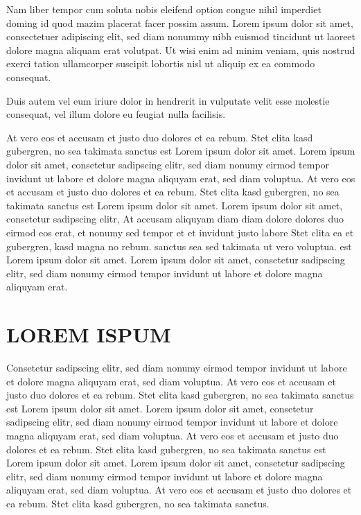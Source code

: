 \documentclass[]{../metanetpaper}
\begin{document}
Nam liber tempor cum soluta nobis eleifend option congue nihil imperdiet doming id quod mazim placerat facer possim assum. Lorem ipsum dolor sit amet, consectetuer adipiscing elit, sed diam nonummy nibh euismod tincidunt ut laoreet dolore magna aliquam erat volutpat. Ut wisi enim ad minim veniam, quis nostrud exerci tation ullamcorper suscipit lobortis nisl ut aliquip ex ea commodo consequat.   

Duis autem vel eum iriure dolor in hendrerit in vulputate velit esse molestie consequat, vel illum dolore eu feugiat nulla facilisis.   

At vero eos et accusam et justo duo dolores et ea rebum. Stet clita kasd gubergren, no sea takimata sanctus est Lorem ipsum dolor sit amet. Lorem ipsum dolor sit amet, consetetur sadipscing elitr, sed diam nonumy eirmod tempor invidunt ut labore et dolore magna aliquyam erat, sed diam voluptua. At vero eos et accusam et justo duo dolores et ea rebum. Stet clita kasd gubergren, no sea takimata sanctus est Lorem ipsum dolor sit amet. Lorem ipsum dolor sit amet, consetetur sadipscing elitr, At accusam aliquyam diam diam dolore dolores duo eirmod eos erat, et nonumy sed tempor et et invidunt justo labore Stet clita ea et gubergren, kasd magna no rebum. sanctus sea sed takimata ut vero voluptua. est Lorem ipsum dolor sit amet. Lorem ipsum dolor sit amet, consetetur sadipscing elitr, sed diam nonumy eirmod tempor invidunt ut labore et dolore magna aliquyam erat.   
\section{LOREM ISPUM}
Consetetur sadipscing elitr, sed diam nonumy eirmod tempor invidunt ut labore et dolore magna aliquyam erat, sed diam voluptua. At vero eos et accusam et justo duo dolores et ea rebum. Stet clita kasd gubergren, no sea takimata sanctus est Lorem ipsum dolor sit amet. Lorem ipsum dolor sit amet, consetetur sadipscing elitr, sed diam nonumy eirmod tempor invidunt ut labore et dolore magna aliquyam erat, sed diam voluptua. At vero eos et accusam et justo duo dolores et ea rebum. Stet clita kasd gubergren, no sea takimata sanctus est Lorem ipsum dolor sit amet. Lorem ipsum dolor sit amet, consetetur sadipscing elitr, sed diam nonumy eirmod tempor invidunt ut labore et dolore magna aliquyam erat, sed diam voluptua. At vero eos et accusam et justo duo dolores et ea rebum. Stet clita kasd gubergren, no sea takimata sanctus.   
\end{document}
